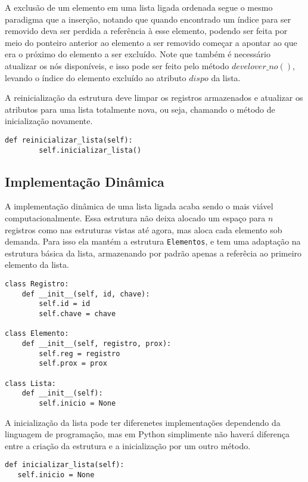\documentclass[a4paper, twocolumn]{article}
\theoremstyle{definition}
\begin{document}
A exclusão de um elemento em uma lista ligada ordenada segue o mesmo paradigma que a inserção, notando que quando encontrado um índice para ser removido deva ser perdida a referência à esse elemento, podendo ser feita por meio do ponteiro anterior ao elemento a ser removido começar a apontar ao que era o próximo do elemento a ser excluído. Note que também é necessário atualizar os nós disponíveis, e isso pode ser feito pelo método $develover\_no()$, levando o índice do elemento excluído ao atributo $dispo$ da lista.

A reinicialização da estrutura deve limpar os registros armazenados e atualizar os atributos para uma lista totalmente nova, ou seja, chamando o método de inicialização novamente.

\begin{lstlisting}[label=lista_ligada_estat_reiniciar,caption= Lista Ligada estática ordenada (reinicialização)]
def reinicializar_lista(self):
        self.inicializar_lista()
\end{lstlisting}

\subsection{Implementação Dinâmica}
A implementação dinâmica de uma lista ligada acaba sendo o mais viável computacionalmente. Essa estrutura não deixa alocado um espaço para $n$ registros como nas estruturas vistas até agora, mas aloca cada elemento sob demanda. Para isso ela mantém a estrutura \texttt{Elementos}, e tem uma adaptação na estrutura básica da lista, armazenando por padrão apenas a referêcia ao primeiro elemento da lista.

\begin{lstlisting}[label=lista_ligada_din_estrutura,caption= Lista Ligada dinâmica (estrutura)]
class Registro:
    def __init__(self, id, chave):
        self.id = id
        self.chave = chave

class Elemento:
    def __init__(self, registro, prox):
        self.reg = registro
        self.prox = prox

class Lista:
    def __init__(self):
        self.inicio = None        
\end{lstlisting}

A inicialização da lista pode ter diferenetes implementações dependendo da linguagem de programação, mas em Python simplimente não haverá diferença entre a criação da estrutura e a inicialização por um outro método.

\begin{lstlisting}[label=lista_ligada_din_inicializar, caption= Lista Ligada dinâmica (inicialização)]
def inicializar_lista(self):
   self.inicio = None
\end{lstlisting}
\end{document}
